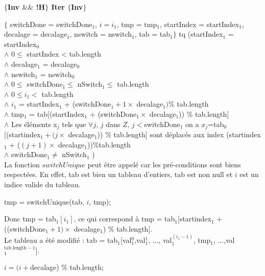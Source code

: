 \textbf{$\{$Inv $\&\&$ !H$\}$ Iter $\{$Inv$\}$}

$\{$ switchDone = switchDone$_{1}$, $i = i_{1}$, tmp = tmp$_{1}$, startIndex = startIndex$_{1}$, decalage = decalage$_{1}$, nswitch = nswitch$_{1}$, tab = tab$_{1} \}$ tq (startIndex$_{1}$ = startIndex$_{0}$\\
$\wedge$ $0 \leq$ startIndex < tab.length \\
$\wedge$ decalage$_{1}$ = decalage$_{0}$\\
$\wedge$ nswitch$_{1}$ = nswitch$_{0}$\\
$\wedge$ $0\leq$ switchDone$_{1} \leq$ nSwitch$_{1} \leq$ tab.length\\
$\wedge$ $0\leq i_{1} <$ tab.length\\
$\wedge$ $i_{1}$ = startIndex$_{1}$ + (switchDone$_{1}+1\times $ decalage$_{1}) \%$ tab.length\\
$\wedge$ tmp$_{1}$ = tab[(startIndex$_{1}$ + (switchDone$_{1}\times$  decalage$_{1}$)) $\%$ tab.length]\\
$\wedge$ Les éléments x$_{j}$ tels que $\forall j$, $j$ dans $Z$, $j<$switchDone$_{1}$ on a $x_{j}$=tab$_{0}$[(startindex$_{1} + (j\times$ decalage$_{1}$)) $\%$ tab.length] sont déplacés aux index (startindex$_{1}$ + ($(j+1)\times$ decalage$_{1}$))$\%$tab.length\\
$\wedge$ switchDone$_{1} \neq$ nSwitch$_{1}$ )\\

La fonction $switchUnique$ peut être appelé car les pré-conditions sont biens respectées. En effet, tab est bien un tableau d'entiers, tab est non null et $i$ est un indice valide du tableau. 

\begin{center}
tmp = switchUnique(tab, $i$, tmp);\\
\end{center}

Donc tmp = tab$_{1}[i_1]$, ce qui correspond à tmp = tab$_{1}$[startindex$_{1}$ + ((switchDone$_{1}+1)\times$ decalage$_{1}$) $\%$ tab.length].\\

Le tableau a été modifié : tab = tab$_{1}$[val$_{1}^{0}$,val$_{1}^{1}$, ..., val$_{1}^{(i_{1}-1)}$, tmp$_{1}$, ...,val$_{1}^{\mathrm{tab.length-1}}]$.

\begin{center}
  $i = (i+$decalage) $\%$ tab.length;\\
\end{center} 
 
